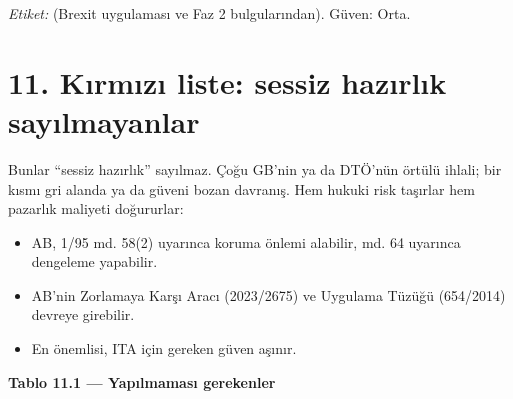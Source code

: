 \endgroup

\emph{Etiket:} \etiketH{} (Brexit uygulaması ve Faz 2 bulgularından). Güven: Orta.

\hypertarget{02c_hazirlik-11-kux131rmux131zux131-liste-sessiz-hazux131rlux131k-sayux131lmayanlar}{%
\section{11. Kırmızı liste: sessiz hazırlık sayılmayanlar}\label{02c_hazirlik-11-kux131rmux131zux131-liste-sessiz-hazux131rlux131k-sayux131lmayanlar}}

Bunlar ``sessiz hazırlık'' sayılmaz. Çoğu GB'nin ya da DTÖ'nün örtülü ihlali; bir kısmı gri alanda ya da güveni bozan davranış. Hem hukuki risk taşırlar hem pazarlık maliyeti doğururlar:

\begin{itemize}
\tightlist
\item
  AB, 1/95 md. 58(2) uyarınca koruma önlemi alabilir, md. 64 uyarınca dengeleme yapabilir.
\item
  AB'nin Zorlamaya Karşı Aracı (2023/2675) ve Uygulama Tüzüğü (654/2014) devreye girebilir.
\item
  En önemlisi, ITA için gereken güven aşınır.
\end{itemize}


\textbf{Tablo 11.1 --- Yapılmaması gerekenler}

\nopagebreak[4]

\begingroup\gbtablo\small

